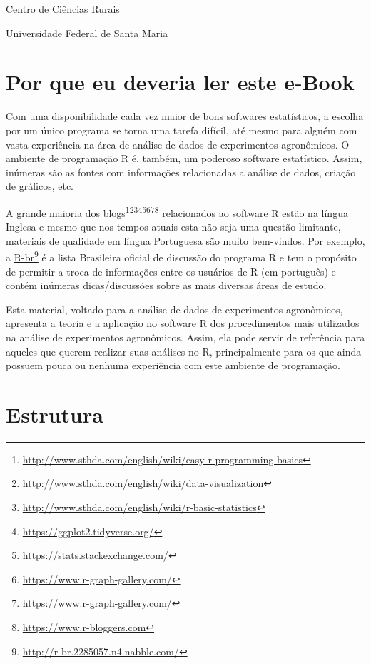 \documentclass[
]{book}
\numberwithin{equation}{section}
\begin{document}
Centro de Ciências Rurais

Universidade Federal de Santa Maria

\hypertarget{por-que-eu-deveria-ler-este-e-book}{%
\section*{Por que eu deveria ler este e-Book}\label{por-que-eu-deveria-ler-este-e-book}}

Com uma disponibilidade cada vez maior de bons softwares estatísticos, a escolha por um único programa se torna uma tarefa difícil, até mesmo para alguém com vasta experiência na área de análise de dados de experimentos agronômicos. O ambiente de programação R é, também, um poderoso software estatístico. Assim, inúmeras são as fontes com informações relacionadas a análise de dados, criação de gráficos, etc.

A grande maioria dos blogs\footnote{\url{http://www.sthda.com/english/wiki/easy-r-programming-basics}}\footnote{\url{http://www.sthda.com/english/wiki/data-visualization}}\footnote{\url{http://www.sthda.com/english/wiki/r-basic-statistics}}\footnote{\url{https://ggplot2.tidyverse.org/}}\footnote{\url{https://stats.stackexchange.com/}}\footnote{\url{https://www.r-graph-gallery.com/}}\footnote{\url{https://www.r-graph-gallery.com/}}\footnote{\url{https://www.r-bloggers.com}} relacionados ao software R estão na língua Inglesa e mesmo que nos tempos atuais esta não seja uma questão limitante, materiais de qualidade em língua Portuguesa são muito bem-vindos. Por exemplo, a \href{http://r-br.2285057.n4.nabble.com/}{R-br}\footnote{\url{http://r-br.2285057.n4.nabble.com/}} é a lista Brasileira oficial de discussão do programa R e tem o propósito de permitir a troca de informações entre os usuários de R (em português) e contém inúmeras dicas/discussões sobre as mais diversas áreas de estudo.

Esta material, voltado para a análise de dados de experimentos agronômicos, apresenta a teoria e a aplicação no software R dos procedimentos mais utilizados na análise de experimentos agronômicos. Assim, ela pode servir de referência para aqueles que querem realizar suas análises no R, principalmente para os que ainda possuem pouca ou nenhuma experiência com este ambiente de programação.

\hypertarget{estrutura}{%
\section*{Estrutura}\label{estrutura}}
\end{document}
